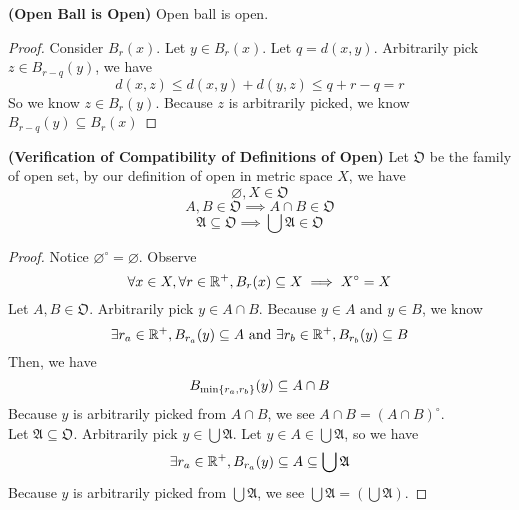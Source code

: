 \documentclass{report}
\begin{document}
\begin{theorem}
\label{2.7.7}
\textbf{(Open Ball is Open)} Open ball is open.
\end{theorem}
\begin{proof}
Consider  $B_r(x)$. Let $y\in B_r(x)$. Let $q=d(x,y)$. Arbitrarily pick $z\in B_{r-q}(y)$, we have
\begin{equation}
d(x,z)\leq d(x,y)+d(y,z)\leq q+r-q=r
\end{equation}
So we know $z \in B_r(y)$. Because $z$ is arbitrarily picked, we know $B_{r-q}(y)\subseteq B_r(x)$  
\end{proof}
\begin{theorem}
\label{2.7.8}
\textbf{(Verification of Compatibility of Definitions of Open)} 
Let $\mathfrak{O}$ be the family of open set, by our definition of open in metric space $X$, we have
 \begin{equation}
\varnothing , X \in \mathfrak{O}
\end{equation}
\begin{equation}
A, B \in \mathfrak{O}\implies A\cap B\in \mathfrak{O}
\end{equation}
\begin{equation}
\mathfrak{A}\subseteq \mathfrak{O}\implies \bigcup \mathfrak{A}\in\mathfrak{O}
\end{equation}
\end{theorem}
\begin{proof}
Notice $\varnothing^\circ =\varnothing$. Observe
\begin{equation}
\forall x\in X, \forall r\in\mathbb{R}^+, B_r(x)\subseteq X \implies X^\circ = X 
\end{equation}
Let $A,B\in \mathfrak{O}$. Arbitrarily pick $y \in A\cap B$. Because $y \in A\text{ and }y\in B$, we know 
\begin{equation}
\exists r_a\in\mathbb{R}^+, B_{r_a}(y)\subseteq A\text{ and }
\exists r_b\in\mathbb{R}^+, B_{r_b}(y)\subseteq B
\end{equation}
Then, we have
\begin{equation}
B_{\min \{ r_a,r_b \}}(y)\subseteq A\cap B
\end{equation}
Because $y$ is arbitrarily picked from  $A\cap B$, we see $A\cap B= (A\cap B)^\circ $.\\

Let $\mathfrak{A}\subseteq \mathfrak{O}$. Arbitrarily pick $y\in \bigcup \mathfrak{A}$. Let $y \in A \in \bigcup \mathfrak{A}$, so we have
\begin{equation}
\exists r_a\in\mathbb{R}^+, B_{r_a}(y)\subseteq A\subseteq \bigcup \mathfrak{A}
\end{equation}
Because $y$ is arbitrarily picked from $\bigcup \mathfrak{A}$, we see $\bigcup \mathfrak{A}=(\bigcup \mathfrak{A})$. 
\end{proof}
\end{document}
